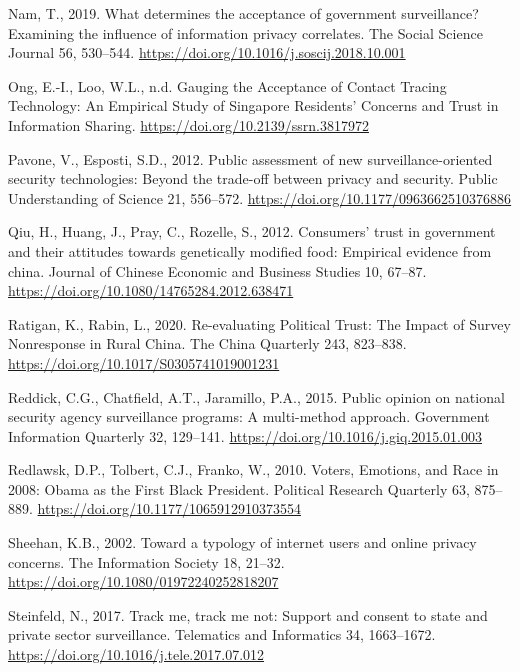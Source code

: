 \documentclass[
  letterpaper,
  DIV=11,
  numbers=noendperiod]{scrartcl}
\newlength{\cslhangindent}
\newenvironment{CSLReferences}[2] %
 {\begin{list}{}{%
  \setlength{\itemindent}{0pt}
  \setlength{\leftmargin}{0pt}
  \setlength{\parsep}{0pt}
  \ifodd #1
   \setlength{\leftmargin}{\cslhangindent}
   \setlength{\itemindent}{-1\cslhangindent}
  \fi
  \setlength{\itemsep}{#2\baselineskip}}}
 {\end{list}}
\begin{document}
\begin{CSLReferences}{1}{0}
Nam, T., 2019. What determines the acceptance of government
surveillance? Examining the influence of information privacy correlates.
The Social Science Journal 56, 530--544.
\url{https://doi.org/10.1016/j.soscij.2018.10.001}

Ong, E.-I., Loo, W.L., n.d. Gauging the Acceptance of Contact Tracing
Technology: An Empirical Study of Singapore Residents' Concerns and
Trust in Information Sharing. \url{https://doi.org/10.2139/ssrn.3817972}

Pavone, V., Esposti, S.D., 2012. Public assessment of new
surveillance-oriented security technologies: Beyond the trade-off
between privacy and security. Public Understanding of Science 21,
556--572. \url{https://doi.org/10.1177/0963662510376886}

Qiu, H., Huang, J., Pray, C., Rozelle, S., 2012. Consumers{'} trust in
government and their attitudes towards genetically modified food:
Empirical evidence from china. Journal of Chinese Economic and Business
Studies 10, 67--87. \url{https://doi.org/10.1080/14765284.2012.638471}

Ratigan, K., Rabin, L., 2020. Re-evaluating Political Trust: The Impact
of Survey Nonresponse in Rural China. The China Quarterly 243, 823--838.
\url{https://doi.org/10.1017/S0305741019001231}

Reddick, C.G., Chatfield, A.T., Jaramillo, P.A., 2015. Public opinion on
national security agency surveillance programs: A multi-method approach.
Government Information Quarterly 32, 129--141.
\url{https://doi.org/10.1016/j.giq.2015.01.003}

Redlawsk, D.P., Tolbert, C.J., Franko, W., 2010. Voters, Emotions, and
Race in 2008: Obama as the First Black President. Political Research
Quarterly 63, 875--889. \url{https://doi.org/10.1177/1065912910373554}

Sheehan, K.B., 2002. Toward a typology of internet users and online
privacy concerns. The Information Society 18, 21--32.
\url{https://doi.org/10.1080/01972240252818207}

Steinfeld, N., 2017. Track me, track me not: Support and consent to
state and private sector surveillance. Telematics and Informatics 34,
1663--1672. \url{https://doi.org/10.1016/j.tele.2017.07.012}


\end{CSLReferences}
\end{document}
